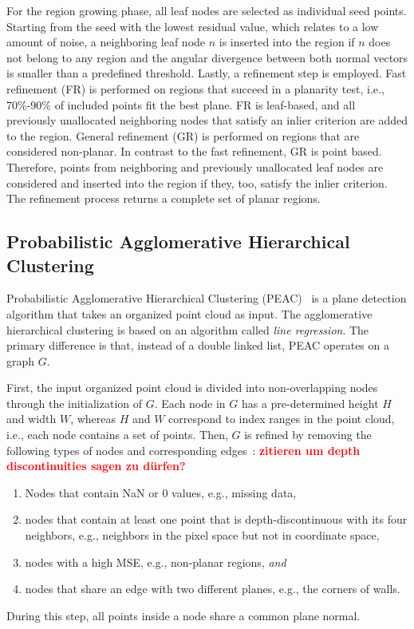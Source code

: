 \documentclass[main.tex]{subfiles}
\begin{document}
For the region growing phase, all leaf nodes are selected as individual seed points. Starting from the seed with the lowest residual value, which relates to a low amount of noise,
a neighboring leaf node $n$ is inserted into the region if $n$ does not belong to any region and the angular divergence between both normal vectors is smaller than
a predefined threshold.
Lastly, a refinement step is employed.
Fast refinement (FR) is performed on regions that succeed in a planarity test, i.e., 70\%-90\% of included points fit the best plane. FR is leaf-based, and all previously unallocated neighboring nodes that satisfy an inlier criterion are added to the region.
General refinement (GR) is performed on regions that are considered non-planar. In contrast to the fast refinement, GR is point based. Therefore,
points from neighboring and previously unallocated leaf nodes are considered and inserted into the region if they, too, satisfy the inlier criterion.
The refinement process returns a complete set of planar regions.

\subsection{Probabilistic Agglomerative Hierarchical Clustering}
Probabilistic Agglomerative Hierarchical Clustering (PEAC)~\cite{Feng_Taguchi_Kamat_2014} is a plane detection algorithm that takes an organized
point cloud as input.
The agglomerative hierarchical clustering is based on an algorithm called 
\textit{line regression}\cite[Section~III.B]{Nguyen_Martinelli_Tomatis_Siegwart_2005}. The primary difference is
that, instead of a double linked list, PEAC operates on a graph $G$.

First, the input organized point cloud is divided into non-overlapping nodes through the initialization of $G$.
Each node in $G$ has a pre-determined height $H$ and width $W$, whereas $H$ and $W$ correspond to index ranges in the 
point cloud, i.e., each node contains a set of points. 
Then, $G$ is refined by removing the following types of nodes and corresponding edges~\cite[Section~III.A]{Feng_Taguchi_Kamat_2014}:
\textbf{\textcolor{red}{zitieren um depth discontinuities sagen zu dürfen?}}
\begin{enumerate}
    \item Nodes that contain NaN or 0 values, e.g., missing data,  
    \item nodes that contain at least one point that is depth-discontinuous with its four neighbors, e.g., neighbors 
    in the pixel space but not in coordinate space, 
    \item nodes with a high MSE, e.g., non-planar regions, \textit{and}
    \item nodes that share an edge with two different planes, e.g., the corners of walls.
\end{enumerate}
During this step, all points inside a node share a common plane normal.
\end{document}

